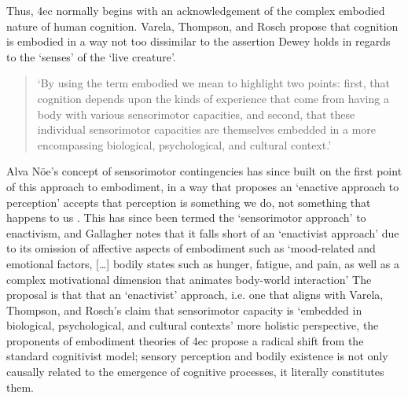 Thus, \gls{4ec} normally begins with an acknowledgement of the complex embodied nature of human cognition. Varela, Thompson, and Rosch propose that cognition is embodied in a way not too dissimilar to the assertion Dewey holds in regards to the `senses' of the `live creature'.
\begin{quote}
    `By using the term embodied we mean to highlight two points: first, that cognition depends upon the kinds of experience that come from having a body with various sensorimotor capacities, and second, that these individual sensorimotor capacities are themselves embedded in a more encompassing biological, psychological, and cultural context.' \citeyearpar[pp. 172-173]{varela1993}
\end{quote}
Alva Nöe's concept of sensorimotor contingencies has since built on the first point of this approach to embodiment, in a way that proposes an `enactive approach to perception' accepts that perception is something we do, not something that happens to us \citep{noe2004}. This has since been termed the `sensorimotor approach' to enactivism, and Gallagher notes that it falls short of an `enactivist approach' due to its omission of affective aspects of embodiment such as `mood-related and emotional factors, […] bodily states such as hunger, fatigue, and pain, as well as a complex motivational dimension that animates body-world interaction' \citep[p. 150]{gallagher2017} The proposal is that that an `enactivist' approach, i.e. one that aligns with Varela, Thompson, and Rosch's claim that sensorimotor capacity is `embedded in biological, psychological, and cultural contexts' more holistic perspective, the proponents of embodiment theories of \gls{4ec} propose a radical shift from the standard cognitivist model; sensory perception and bodily existence is not only causally related to the emergence of cognitive processes, it literally constitutes them. 

